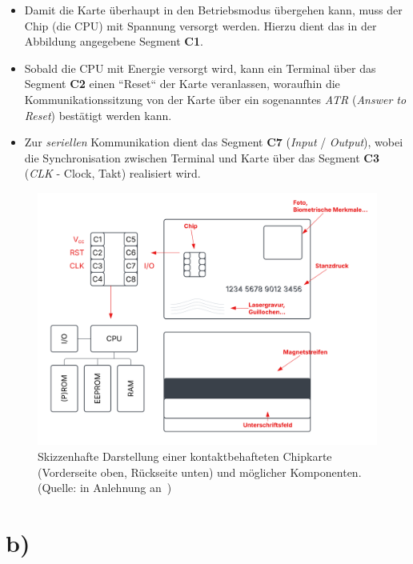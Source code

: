 \begin{itemize}
\begin{itemize}
        \item Damit die Karte überhaupt in den Betriebsmodus übergehen kann, muss der Chip (die CPU) mit Spannung versorgt werden. Hierzu dient das in der Abbildung angegebene Segment \textbf{C1}.

        \item Sobald die CPU mit Energie versorgt wird, kann ein Terminal über das Segment \textbf{C2} einen ``Reset`` der Karte veranlassen, woraufhin die Kommunikationssitzung von der Karte über ein sogenanntes \textit{ATR} (\textit{Answer to Reset}) bestätigt werden kann.

        \item Zur \textit{seriellen} Kommunikation dient das Segment \textbf{C7} (\textit{Input} / \textit{Output}), wobei die Synchronisation zwischen Terminal und Karte über das Segment \textbf{C3} (\textit{CLK} - Clock, Takt) realisiert wird.
    \end{itemize}
\end{itemize}

\begin{figure}
    \centering
    \includegraphics[scale=0.4]{aufgabe 1/img/chipkarte.svg}
    \caption{Skizzenhafte Darstellung einer kontaktbehafteten Chipkarte (Vorderseite oben, Rückseite unten) und möglicher Komponenten. (Quelle: in Anlehnung an~\cite[\textbf{Abb. 2.1}, 9 sowie \textbf{Abb. 2.2}, 10]{ITS5})}
    \label{fig:chipkarte}
\end{figure}


\section{b)}

